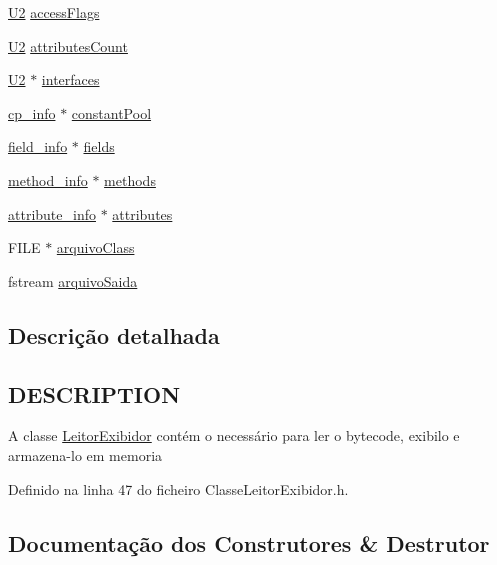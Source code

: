 \begin{DoxyCompactItemize}
\hyperlink{BasicTypes_8h_a90240657108b1b457eef9d3f76e0202e}{U2} \hyperlink{classLeitorExibidor_a16d6ecbc6b367cda3c0b774505285665}{access\+Flags}
\item 
\hyperlink{BasicTypes_8h_a90240657108b1b457eef9d3f76e0202e}{U2} \hyperlink{classLeitorExibidor_ac42b42a9a6c94c260db0016df94cda1d}{attributes\+Count}
\item 
\hyperlink{BasicTypes_8h_a90240657108b1b457eef9d3f76e0202e}{U2} $\ast$ \hyperlink{classLeitorExibidor_a7c19cc595c9d806b30477b5b008f3caa}{interfaces}
\item 
\hyperlink{structcp__info}{cp\+\_\+info} $\ast$ \hyperlink{classLeitorExibidor_ac92916cbf475e31ce0f2475d982ddaea}{constant\+Pool}
\item 
\hyperlink{structfield__info}{field\+\_\+info} $\ast$ \hyperlink{classLeitorExibidor_a6e8475e2db54d776db636c06d823eb3f}{fields}
\item 
\hyperlink{structmethod__info}{method\+\_\+info} $\ast$ \hyperlink{classLeitorExibidor_a0c9110ffe495c55bedaafdc47656eaed}{methods}
\item 
\hyperlink{structattribute__info}{attribute\+\_\+info} $\ast$ \hyperlink{classLeitorExibidor_adb26d0959bef738b08bffa009d12fac3}{attributes}
\item 
F\+I\+LE $\ast$ \hyperlink{classLeitorExibidor_acbb3d188113d55cc00b6e92bf2fddb98}{arquivo\+Class}
\item 
fstream \hyperlink{classLeitorExibidor_ae7f2edb9968df63470901712119e30d2}{arquivo\+Saida}
\end{DoxyCompactItemize}


\subsection{Descrição detalhada}
\hypertarget{classLeitorExibidor_DESCRIPTION}{}\subsection{D\+E\+S\+C\+R\+I\+P\+T\+I\+ON}\label{classLeitorExibidor_DESCRIPTION}
A classe \hyperlink{classLeitorExibidor}{Leitor\+Exibidor} contém o necessário para ler o bytecode, exibilo e armazena-\/lo em memoria 

Definido na linha 47 do ficheiro Classe\+Leitor\+Exibidor.\+h.



\subsection{Documentação dos Construtores \& Destrutor}
\mbox{\label{classLeitorExibidor_aa1ffcfe21da762169b16483e4d30f683}} 
